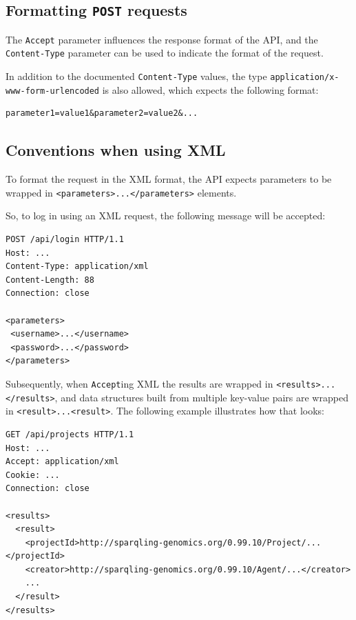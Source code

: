 \subsection{Formatting \texttt{POST} requests}

  The \texttt{Accept} parameter influences the response format of the API,
  and the \texttt{Content-Type} parameter can be used to indicate the format
  of the request.

  In addition to the documented \texttt{Content-Type} values, the type
  \texttt{application/x-www-form-urlencoded} is also allowed, which expects
  the following format:
\begin{siderules}
\begin{verbatim}
parameter1=value1&parameter2=value2&...
\end{verbatim}
\end{siderules}

\subsection{Conventions when using XML}

\begin{sloppypar}
  To format the request in the XML format, the API expects
  parameters to be wrapped in \texttt{<parameters>...</parameters>} elements.
\end{sloppypar}
  So, to log in using an XML request, the following message will be accepted:

\begin{siderules}
\begin{verbatim}
POST /api/login HTTP/1.1
Host: ...
Content-Type: application/xml
Content-Length: 88
Connection: close

<parameters>
 <username>...</username>
 <password>...</password>
</parameters>
\end{verbatim}
\end{siderules}

  Subsequently, when \texttt{Accept}ing XML the results are wrapped in
  \texttt{<results>...</results>}, and data structures built from multiple
  key-value pairs are wrapped in \texttt{<result>...<result>}.  The
  following example illustrates how that looks:

\begin{siderules}
\begin{verbatim}
GET /api/projects HTTP/1.1
Host: ...
Accept: application/xml
Cookie: ...
Connection: close

<results>
  <result>
    <projectId>http://sparqling-genomics.org/0.99.10/Project/...</projectId>
    <creator>http://sparqling-genomics.org/0.99.10/Agent/...</creator>
    ...
  </result>
</results>
\end{verbatim}
\end{siderules}

